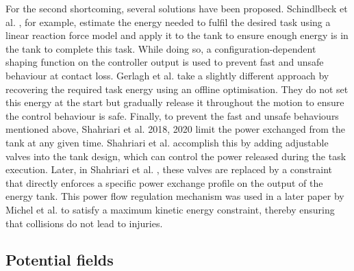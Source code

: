 For the second shortcoming, several solutions have been proposed. Schindlbeck et al. \cite{schindlbeckUnifiedPassivitybasedCartesian2015}, for example, estimate the energy needed to fulfil the desired task using a linear reaction force model and apply it to the tank to ensure enough energy is in the tank to complete this task. While doing so, a configuration-dependent shaping function on the controller output is used to prevent fast and unsafe behaviour at contact loss. Gerlagh et al. \cite{gerlaghEnergyawareAdaptiveImpedance2021} take a slightly different approach by recovering the required task energy using an offline optimisation. They do not set this energy at the start but gradually release it throughout the motion to ensure the control behaviour is safe. Finally, to prevent the fast and unsafe behaviours mentioned above, Shahriari et al. 2018, 2020 \cite{shahriariValvebasedVirtualEnergy2018,shahriariPowerFlowRegulation2020} limit the power exchanged from the tank at any given time. Shahriari et al. \cite{shahriariValvebasedVirtualEnergy2018} accomplish this by adding adjustable valves into the tank design, which can control the power released during the task execution. Later, in Shahriari et al. \cite{shahriariPowerFlowRegulation2020}, these valves are replaced by a constraint that directly enforces a specific power exchange profile on the output of the energy tank. This power flow regulation mechanism was used in a later paper by Michel et al. \cite{michelSafetyAwareHierarchicalPassivityBased2022} to satisfy a maximum kinetic energy constraint, thereby ensuring that collisions do not lead to injuries.

\subsection{Potential fields}

